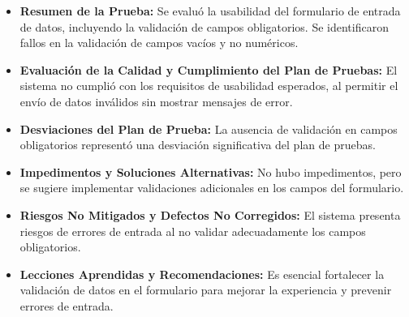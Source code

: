 \documentclass[stu, 12pt, letterpaper, donotrepeattitle, floatsintext, natbib]{apa7}
\begin{document}
\begin{itemize}
    \item \textbf{Resumen de la Prueba:} Se evaluó la usabilidad del formulario de entrada de datos, incluyendo la validación de campos obligatorios. Se identificaron fallos en la validación de campos vacíos y no numéricos.
    
    \item \textbf{Evaluación de la Calidad y Cumplimiento del Plan de Pruebas:} El sistema no cumplió con los requisitos de usabilidad esperados, al permitir el envío de datos inválidos sin mostrar mensajes de error.
    
    \item \textbf{Desviaciones del Plan de Prueba:} La ausencia de validación en campos obligatorios representó una desviación significativa del plan de pruebas.
    
    \item \textbf{Impedimentos y Soluciones Alternativas:} No hubo impedimentos, pero se sugiere implementar validaciones adicionales en los campos del formulario.
    
    \item \textbf{Riesgos No Mitigados y Defectos No Corregidos:} El sistema presenta riesgos de errores de entrada al no validar adecuadamente los campos obligatorios.
    
    \item \textbf{Lecciones Aprendidas y Recomendaciones:} Es esencial fortalecer la validación de datos en el formulario para mejorar la experiencia y prevenir errores de entrada.
\end{itemize}
\small %
\renewcommand{\arraystretch}{1.0} %
\setlength{\tabcolsep}{4pt} %
\end{document}

